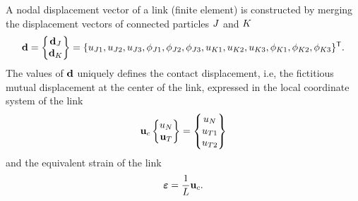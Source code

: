 A nodal displacement vector of a link (finite element) is constructed by merging the displacement vectors of connected particles $J$ and $K$
\begin{equation}
	\linkNodalDsplVector
	=
	\begin{Bmatrix}
		\nodalDsplVector_\particleA
		\\
		\nodalDsplVector_\particleB
	\end{Bmatrix}
	=
	\{
		\displacement_{\particleA1},
		\displacement_{\particleA2},
		\displacement_{\particleA3},
		\rotation_{\particleA1},
		\rotation_{\particleA2},
		\rotation_{\particleA3},
		\displacement_{\particleB1},
		\displacement_{\particleB2},
		\displacement_{\particleB3},
		\rotation_{\particleB1},
		\rotation_{\particleB2},
		\rotation_{\particleB3}
	\}\T
	.
	\label{eqMacroPropertiesElasticLinkNodalDsplVectorDef}
\end{equation}
The values of $\linkNodalDsplVector$ uniquely defines the contact displacement, i.e, the fictitious mutual displacement at the center of the link, expressed in the local coordinate system of the link
\begin{equation}
	\displacementVector_\contact \begin{Bmatrix}
		\displacement_\normalComponent \\
		\displacementVector_\shearComponent
	\end{Bmatrix}
	= \begin{Bmatrix}
		\displacement_\normalComponent \\
		\displacement_{\shearComponent1} \\
		\displacement_{\shearComponent2} \\
	\end{Bmatrix}
\end{equation}
and the equivalent strain of the link
\begin{equation}
	\linkStrainVector = \frac{1}{\linkLength}\displacementVector_\contact
	.
\end{equation}

